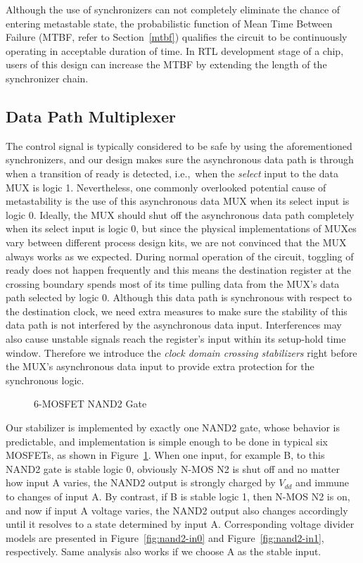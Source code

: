 \documentclass[12pt]{article}
\newcommand{\reffig}[1]{Figure~\ref{#1}}
\newcommand{\refsec}[1]{Section~\ref{#1}}
\newcommand{\ie}{i.e.,~}
\begin{document}
Although the use of synchronizers can not completely eliminate the chance of
entering metastable state, the probabilistic function of Mean Time Between
Failure (MTBF, refer to \refsec{mtbf}) qualifies the circuit to be continuously
operating in acceptable duration of time. In RTL development stage of a chip,
users of this design can increase the MTBF by extending the length of the
synchronizer chain.

\subsection{Data Path Multiplexer} \label{data}
The control signal is typically considered to be safe by using the
aforementioned synchronizers, and our design makes sure the asynchronous data
path is through when a transition of ready is detected, \ie when the
\textit{select} input to the data MUX is logic 1. Nevertheless, one commonly
overlooked potential cause of metastability is the use of this asynchronous
data MUX when its select input is logic 0. Ideally, the MUX should shut off the
asynchronous data path completely when its select input is logic 0, but since
the physical implementations of MUXes vary between different process design
kits, we are not convinced that the MUX always works as we expected.  During
normal operation of the circuit, toggling of ready does not happen
frequently and this means the destination register at the crossing boundary
spends most of its time pulling data from the MUX's data path selected by logic
0. Although this data path is synchronous with respect to the destination
clock, we need extra measures to make sure the stability of this data path is
not interfered by the asynchronous data input. Interferences may also cause
unstable signals reach the register's input within its setup-hold time window.
Therefore we introduce the \textit{clock domain crossing stabilizers} right
before the MUX's asynchronous data input to provide extra protection for the
synchronous logic.

\begin{figure}[h]
\centering

\caption{6-MOSFET NAND2 Gate}
\label{fig:nand2}
\end{figure}
Our stabilizer is implemented by exactly one NAND2 gate, whose behavior is
predictable, and implementation is simple enough to be done in typical six
MOSFETs, as shown in \reffig{fig:nand2}. When one input, for example B, to this
NAND2 gate is stable logic 0, obviously N-MOS N2 is shut off and no matter how
input A varies, the NAND2 output is strongly charged by $V_{dd}$ and immune to
changes of input A. By contrast, if B is stable logic 1, then N-MOS N2 is on,
and now if input A voltage varies, the NAND2 output also changes accordingly
until it resolves to a state determined by input A. Corresponding voltage
divider models are presented in \reffig{fig:nand2-in0} and
\reffig{fig:nand2-in1}, respectively. Same analysis also works if we choose A
as the stable input.
\end{document}
